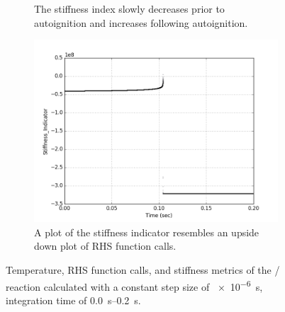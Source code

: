 \documentclass[12pt]{ussci}
\begin{document}
\begin{figure}[htbp]
\begin{subfigure}{0.42\textwidth}
        \caption{The stiffness index slowly decreases prior to autoignition and increases following autoignition.}
        \label{fig:SI1H2COAuto}
    \end{subfigure}
        \begin{subfigure}{0.42\textwidth}
        \includegraphics[width=\linewidth]{Autoignition_Stiffness_Indicator_1e-06_08_03.png}
        \caption{A plot of the stiffness indicator resembles an upside down plot of RHS function calls.}
        \label{fig:SI2H2COAuto}
    \end{subfigure}
    \caption{Temperature, RHS function calls, and stiffness metrics of the \slash {} reaction calculated with a constant step size of \SI{e-6}{\second}, integration time of \SIrange{0.0}{0.2}{\second}.}
    \label{fig:H2COAutoStiffness}
\end{figure}
\end{document}
